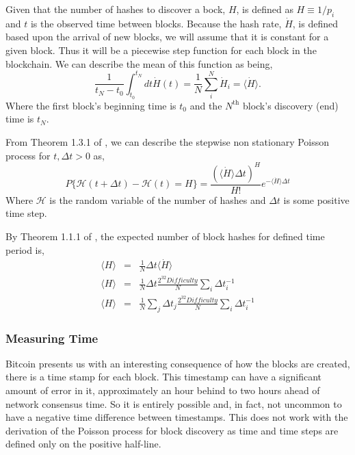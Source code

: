 \documentclass[runningheads]{llncs}
\begin{document}
Given that the number of hashes to discover a bock, $H$, is defined as $H \equiv 1/p_i$ and $t$ is the observed time between blocks.
Because the hash rate, $\dot{H}$, is defined based upon the arrival of new blocks, we will assume that it is constant for a given block.
Thus it will be a piecewise step function for each block in the blockchain.
We can describe the mean of this function as being,
\begin{equation}
    \frac{1}{t_N - t_0}\int_{t_0}^{t_N} dt \dot{H}(t) =  \frac{1}{N}\sum_i^N \dot{H}_i = \langle \dot{H} \rangle. \label{eq:7}
\end{equation}
Where the first block's beginning time is $t_0$ and the $N^{\mbox{th}}$ block's discovery (end) time is $t_N$.

From Theorem 1.3.1 of \cite{tijms2003first}, we can describe the stepwise non stationary Poisson process for $t,\Delta t >0$ as,
\begin{equation}
    P\lbrace \mathcal{H}(t + \Delta t) - \mathcal{H}(t)= H\rbrace = \frac{(\langle \dot{H} \rangle \Delta t)^H}{H!}e^{-\langle \dot{H} \rangle \Delta t}\label{eq:8}
\end{equation}
Where $\mathcal{H}$ is the random variable of the number of hashes and $\Delta t$ is some positive time step.

By Theorem 1.1.1 of \cite{tijms2003first}, the expected number of block hashes for defined time period is,
\begin{eqnarray}
    \langle H \rangle &=& \frac{1}{N}\Delta t \langle \dot{H} \rangle  \nonumber\\
    \langle H \rangle &=& \frac{1}{N}\Delta t \frac{2^{32}Difficulty}{N} \sum_i \Delta t_i^{-1} \nonumber\\
    \langle H \rangle &=& \frac{1}{N}\sum_j \Delta t_j \frac{2^{32}Difficulty}{N} \sum_i \Delta t_i^{-1} \label{eq:18}
\end{eqnarray}

\subsubsection{Measuring Time}
Bitcoin presents us with an interesting consequence of how the blocks are created, there is a time stamp for each block.
This timestamp can have a significant amount of error in it, approximately an hour behind to two hours ahead of network consensus time.
So it is entirely possible and, in fact, not uncommon to have a negative time difference between timestamps.
This does not work with the derivation of the Poisson process for block discovery as time and time steps are defined only on the positive half-line.
\end{document}
